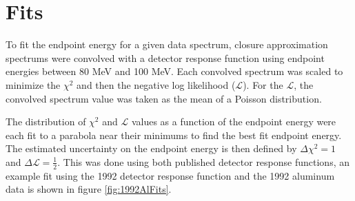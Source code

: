 
\section { Fits }

To fit the endpoint energy for a given data spectrum, closure approximation spectrums were convolved with a detector
response function using endpoint energies between 80 MeV and 100 MeV.
Each convolved spectrum was scaled to minimize the $\chi^2$ and then the negative log likelihood ($\mathcal{L}$).
For the $\mathcal{L}$, the convolved spectrum value was taken as the mean of
a Poisson distribution.



The distribution of $\chi^2$ and $\mathcal{L}$ values as a function of the endpoint energy were each fit to a parabola near 
their minimums to find the best fit endpoint energy. The estimated uncertainty on the endpoint energy is then
defined by $\Delta \chi^2 = 1$ and $\Delta \mathcal{L} = \frac{1}{2}$. This was done using both published detector response
functions, an example fit using the 1992 detector response function
and the 1992 aluminum data is shown in figure \ref{fig:1992AlFits}. 

